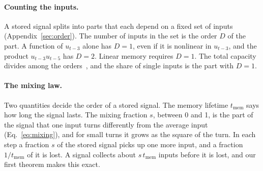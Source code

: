 \paragraph{Counting the inputs.}
A stored signal splits into parts that each depend on a fixed set of inputs (Appendix~\ref{sec:order}). The number of
inputs in the set is the order $D$ of the part. A function of $u_{t-3}$ alone has $D=1$, even if it is nonlinear in
$u_{t-3}$, and the product $u_{t-3}u_{t-5}$ has $D=2$. Linear memory requires $D=1$. The total capacity divides among
the orders~\cite{Dambre2012,MartinezPenaIPC2023}, and the share of single inputs is the part with $D=1$.

\paragraph{The mixing law.}
Two quantities decide the order of a stored signal. The memory lifetime $t_{\mathrm{mem}}$ says how long the signal
lasts. The mixing fraction $s$, between 0 and 1, is the part of the signal that one input turns differently from the
average input (Eq.~\eqref{eq:mixing}), and for small turns it grows as the square of the turn. In each step a
fraction $s$ of the stored signal picks up one more input, and a fraction $1/t_{\mathrm{mem}}$ of it is lost. A
signal collects about $s\,t_{\mathrm{mem}}$ inputs before it is lost, and our first theorem makes this exact.

